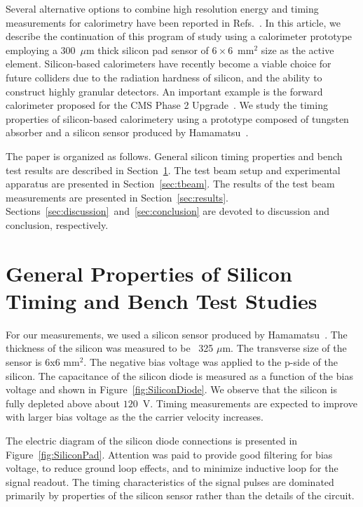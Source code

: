 \documentclass[preprint,1p]{elsarticle}
\begin{document}
Several alternative options to combine high resolution energy and timing
measurements for calorimetry have been reported in Refs.~\cite{Anderson:2015gha,
MCPFastCaloNIMA, Ronzhin2015288, Ronzhin201552, Brianza2015216}. In this
article, we describe the continuation of this program of study using a
calorimeter prototype employing a 300~$\mu$m thick silicon pad sensor of
$6\times 6$~mm$^2$ size as the active element. Silicon-based calorimeters have
recently become a viable choice for future colliders due to the radiation
hardness of silicon, and the ability to construct highly granular detectors. An
important example is the forward calorimeter proposed for the CMS Phase 2
Upgrade~\cite{Butler:2020886, Adloff:2011ha}. We study the timing properties of silicon-based
calorimetery using a prototype composed of tungsten absorber and a silicon
sensor produced by Hamamatsu~\cite{hamamatsu}. 

The paper is organized as follows. General silicon timing properties and bench
test results are described in Section~\ref{sec:siliconpad}. The test beam setup
and experimental apparatus are presented in Section~\ref{sec:tbeam}. The results
of the test beam measurements are presented in Section~\ref{sec:results}.
Sections~\ref{sec:discussion}~and~\ref{sec:conclusion} are devoted to discussion
and conclusion, respectively.

\section{General Properties of Silicon Timing and Bench Test Studies}
\label{sec:siliconpad}

For our measurements, we used a silicon sensor produced by
Hamamatsu~\cite{hamamatsu}. The thickness of the silicon was measured to be ~325
$\mu$m. The transverse size of the sensor is 6x6 mm$^2$. The negative bias
voltage was applied to the p-side of the silicon. The capacitance
of the silicon diode is measured as a function of the bias voltage
and shown in Figure~\ref{fig:SiliconDiode}. We observe that the silicon
is fully depleted above about $120$~V. Timing measurements are expected
to improve with larger bias voltage as the the carrier velocity increases.

The electric diagram of the silicon
diode connections is presented in Figure~\ref{fig:SiliconPad}. Attention was
paid to provide good filtering for bias voltage, to reduce ground loop effects, and
to minimize inductive loop for the signal readout. The timing characteristics
of the signal pulses are dominated primarily by properties of the
silicon sensor rather than the details of the circuit.
\end{document}
